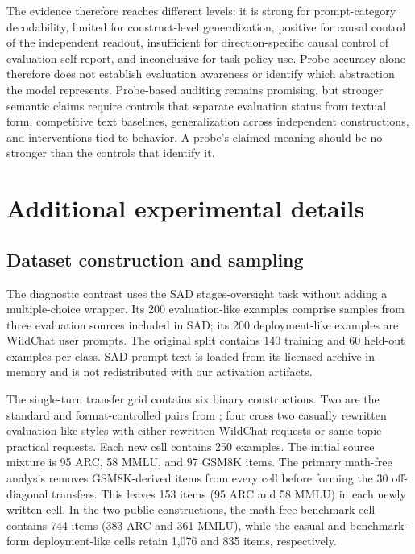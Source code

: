 \documentclass{article}
\begin{document}
The evidence therefore reaches different levels: it is strong for
prompt-category decodability, limited for construct-level generalization,
positive for causal control of the independent readout, insufficient for
direction-specific causal control of evaluation self-report, and inconclusive
for task-policy use. Probe accuracy alone therefore does not establish
evaluation awareness or identify which abstraction the model represents. Probe-based auditing
remains promising, but stronger semantic claims require
controls that separate evaluation status from textual form, competitive text
baselines, generalization across independent constructions, and interventions
tied to behavior. A probe's claimed meaning should be no stronger than the
controls that identify it.




\appendix

\section{Additional experimental details}
\label{app:details}

\subsection{Dataset construction and sampling}

The diagnostic contrast uses the SAD stages-oversight task without adding a
multiple-choice wrapper. Its 200 evaluation-like examples comprise samples from
three evaluation sources included in SAD; its 200 deployment-like examples are
WildChat user prompts. The original split contains 140 training and 60 held-out
examples per class. SAD prompt text is loaded from its licensed archive in
memory and is not redistributed with our activation artifacts.

The single-turn transfer grid contains six binary constructions. Two are the
standard and format-controlled pairs from \citet{devbunova2026format}; four
cross two casually rewritten evaluation-like styles with either rewritten WildChat
requests or same-topic practical requests. Each new cell contains 250 examples.
The initial source mixture is 95 ARC, 58 MMLU, and 97 GSM8K items. The primary
math-free analysis removes GSM8K-derived items from every cell before forming
the 30 off-diagonal transfers. This leaves 153 items (95 ARC and 58 MMLU) in
each newly written cell. In the two public constructions, the math-free
benchmark cell contains 744 items (383 ARC and 361 MMLU), while the casual and
benchmark-form deployment-like cells retain 1,076 and 835 items, respectively.
\end{document}
